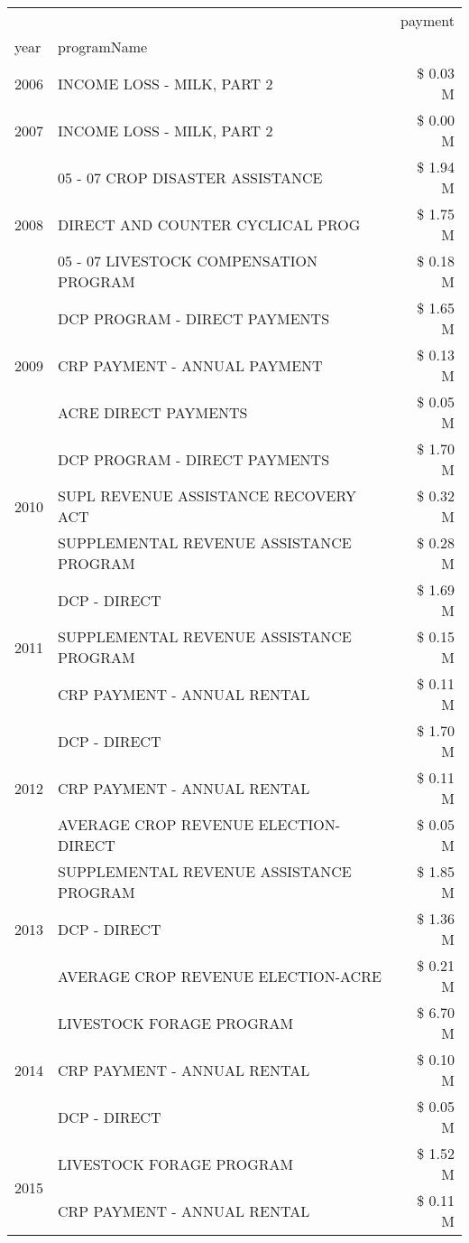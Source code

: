 \begin{tabular}{llr}
\toprule
 &  & payment \\
year & programName &  \\
\midrule
2006 & INCOME LOSS - MILK, PART 2 & \$ 0.03 M \\
\cline{1-3}
2007 & INCOME LOSS - MILK, PART 2 & \$ 0.00 M \\
\cline{1-3}
\multirow[t]{3}{*}{2008} & 05 - 07 CROP DISASTER ASSISTANCE & \$ 1.94 M \\
 & DIRECT AND COUNTER CYCLICAL PROG & \$ 1.75 M \\
 & 05 - 07 LIVESTOCK COMPENSATION PROGRAM & \$ 0.18 M \\
\cline{1-3}
\multirow[t]{3}{*}{2009} & DCP PROGRAM - DIRECT PAYMENTS & \$ 1.65 M \\
 & CRP PAYMENT - ANNUAL PAYMENT & \$ 0.13 M \\
 & ACRE DIRECT PAYMENTS & \$ 0.05 M \\
\cline{1-3}
\multirow[t]{3}{*}{2010} & DCP PROGRAM - DIRECT PAYMENTS & \$ 1.70 M \\
 & SUPL REVENUE ASSISTANCE RECOVERY ACT & \$ 0.32 M \\
 & SUPPLEMENTAL REVENUE ASSISTANCE PROGRAM & \$ 0.28 M \\
\cline{1-3}
\multirow[t]{3}{*}{2011} & DCP - DIRECT & \$ 1.69 M \\
 & SUPPLEMENTAL REVENUE ASSISTANCE PROGRAM & \$ 0.15 M \\
 & CRP PAYMENT - ANNUAL RENTAL & \$ 0.11 M \\
\cline{1-3}
\multirow[t]{3}{*}{2012} & DCP - DIRECT & \$ 1.70 M \\
 & CRP PAYMENT - ANNUAL RENTAL & \$ 0.11 M \\
 & AVERAGE CROP REVENUE ELECTION-DIRECT & \$ 0.05 M \\
\cline{1-3}
\multirow[t]{3}{*}{2013} & SUPPLEMENTAL REVENUE ASSISTANCE PROGRAM & \$ 1.85 M \\
 & DCP - DIRECT & \$ 1.36 M \\
 & AVERAGE CROP REVENUE ELECTION-ACRE & \$ 0.21 M \\
\cline{1-3}
\multirow[t]{3}{*}{2014} & LIVESTOCK FORAGE PROGRAM & \$ 6.70 M \\
 & CRP PAYMENT - ANNUAL RENTAL & \$ 0.10 M \\
 & DCP - DIRECT & \$ 0.05 M \\
\cline{1-3}
\multirow[t]{3}{*}{2015} & LIVESTOCK FORAGE PROGRAM & \$ 1.52 M \\
 & CRP PAYMENT - ANNUAL RENTAL & \$ 0.11 M \\

\end{tabular}
